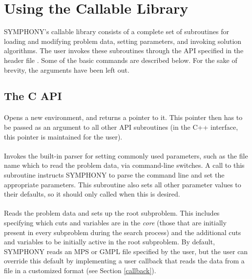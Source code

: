 \section{Using the Callable Library}\label{callable_library}

SYMPHONY's callable library consists of a complete set of subroutines for
loading and modifying problem data, setting parameters, and invoking solution
algorithms. The user invokes these subroutines through the API specified in
the header file . Some of the basic commands are 
described below. For the sake of brevity, the arguments have been left out. 

\subsection{The C API}

\paragraph{} Opens a new environment, and
returns a pointer to it. This pointer then has to be passed as an argument to
all other API subroutines (in the C++ interface, this pointer is maintained
for the user).

\paragraph{} Invokes the built-in
parser for setting commonly used parameters, such as the file name which to
read the problem data, via command-line switches. A call to this subroutine
instructs SYMPHONY to parse the command line and set the appropriate
parameters. This subroutine also sets all other parameter values to their
defaults, so it should only called when this is desired.

\paragraph{} Reads the problem data and sets up
the root subproblem. This includes specifying which cuts and variables are in
the \emph{core} (those that are initially present in every subproblem during
the search process) and the additional cuts and variables to be initially
active in the root subproblem. By default, SYMPHONY reads an MPS or GMPL
file specified by the user, but the user can override this default by
implementing a user callback that reads the data from a file in a customized
format (see Section \ref{callback}).

